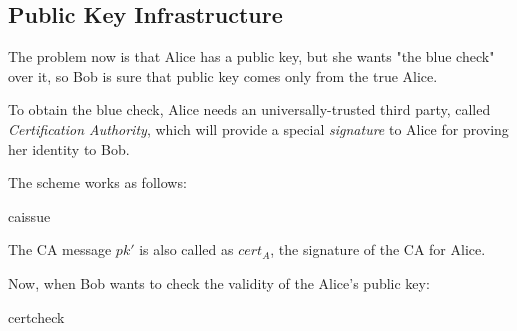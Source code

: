 \subsection{Public Key Infrastructure}

The problem now is that Alice has a public key, but she wants "the blue check" over it, so Bob is sure that public key comes only from the true Alice.

To obtain the blue check, Alice needs an universally-trusted third party, called \textit{Certification Authority}, which will provide a special \textit{signature} to Alice for proving her identity to Bob.

The scheme works as follows:

\begin{cryptosequence}
    {caissue}
    {}


    \cseqdelay

    
    \cseqdelay

    
\end{cryptosequence}

The CA message $pk'$ is also called as $cert_{A}$, the signature of the CA for Alice.

Now, when Bob wants to check the validity of the Alice's public key:

\begin{cryptosequence}
    {certcheck}
    {}


    \cseqdelay


    \cseqdelay

    
    \cseqdelay


\end{cryptosequence}

